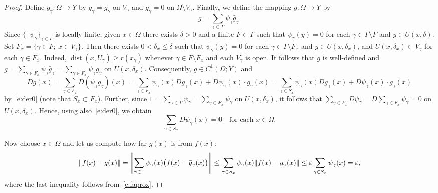 \documentclass[a4paper,twoside,10pt,reqno,draft]{amsart}
\theoremstyle{definition}
\theoremstyle{remark}
\newcommand\setsep{;\allowbreak\ } %
\newcommand\norm[1]{\mathopen\|#1\mathclose\|}
\newcommand\normb[2]{\csname#1l\endcsname\|#2\csname#1r\endcsname\|}
\newcommand\ga{\gamma}
\newcommand\Ga{\Gamma}
\newcommand\de{\delta}
\newcommand\ve{\varepsilon}
\newcommand\Om{\Omega}
\DeclareMathOperator{\suppo}{supp_o}
\DeclareMathOperator{\dist}{dist}
\begin{document}
\begin{proof}
Define $\bar g_\ga\colon\Om\to Y$ by $\bar g_\ga=g_\ga$ on $V_\ga$ and $\bar g_\ga=0$ on $\Om\setminus V_\ga$.
Finally, we define the mapping $g\colon\Om\to Y$ by
\[
g=\sum_{\ga\in\Ga}\psi_\ga\bar g_\ga.
\]
Since $\{\suppo\psi_\ga\}_{\ga\in\Ga}$ is locally finite, given $x\in\Om$ there exists $\de>0$ and a finite $F\subset\Ga$ such that $\psi_\ga(y)=0$ for each $\ga\in\Ga\setminus F$ and $y\in U(x,\de)$.
Set $F_x=\{\ga\in F\setsep x\in V_\ga\}$.
Then there exists $0<\de_x\le\de$ such that $\psi_\ga(y)=0$ for each $\ga\in\Ga\setminus F_x$ and $y\in U(x,\de_x)$, and $U(x,\de_x)\subset V_\ga$ for each $\ga\in F_x$.
Indeed, $\dist(x,U_\ga)\ge r(x_\ga)$ whenever $\ga\in F\setminus F_x$ and each $V_\ga$ is open.
It follows that $g$ is well-defined and $g=\sum_{\ga\in F_x}\psi_\ga\bar g_\ga=\sum_{\ga\in F_x}\psi_\ga g_\ga$ on $U(x,\de_x)$.
Consequently, $g\in C^1(\Om;Y)$ and
\begin{equation}\label{e:derg}
Dg(x)=\sum_{\ga\in F_x}D(\psi_\ga g_\ga)(x)=\sum_{\ga\in F_x}\psi_\ga(x)Dg_\ga(x)+D\psi_\ga(x)\cdot g_\ga(x)=\sum_{\ga\in S_x}\psi_\ga(x)Dg_\ga(x)+D\psi_\ga(x)\cdot g_\ga(x)
\end{equation}
by~\eqref{e:der0} (note that $S_x\subset F_x$).
Further, since $1=\sum_{\ga\in\Ga}\psi_\ga=\sum_{\ga\in F_x}\psi_\ga$ on $U(x,\de_x)$, it follows that $\sum_{\ga\in F_x}D\psi_\ga=D\sum_{\ga\in F_x}\psi_\ga=0$ on $U(x,\de_x)$.
Hence, using also~\eqref{e:der0}, we obtain
\begin{equation}\label{e:sum_der=0}
\sum_{\ga\in S_x}D\psi_\ga(x)=0\quad\text{for each $x\in\Om$.}
\end{equation}

Now choose $x\in\Om$ and let us compute how far $g(x)$ is from $f(x)$:
\[
\norm{f(x)-g(x)}=\normb{Bigg}{\sum_{\ga\in\Ga}\psi_\ga(x)\bigl(f(x)-\bar g_\ga(x)\bigr)}\le\sum_{\ga\in S_x}\psi_\ga(x)\norm{f(x)-g_\ga(x)}\le\ve\sum_{\ga\in S_x}\psi_\ga(x)=\ve,
\]
where the last inequality follows from~\eqref{e:faprox}.


\end{proof}
\end{document}

